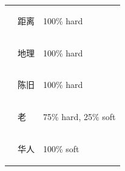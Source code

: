 \documentclass[smallextended,natbib]{svjour3}       %
\providecommand{\DIFaddend}{} %
\begin{document}
\begin{table}[ht]
{\begin{tabular}{|c|l|l|}
       & \begin{CJK}{UTF8}{gbsn}距离\end{CJK}  & 100\% hard                           \\ \cline{2-3} 
       & \begin{CJK}{UTF8}{gbsn}地理\end{CJK}  & 100\% hard                           \\ \cline{2-3} 
       & \begin{CJK}{UTF8}{gbsn}陈旧\end{CJK}  & 100\% hard                           \\ \cline{2-3} 
       & \begin{CJK}{UTF8}{gbsn}老\end{CJK}   & 75\% hard, 25\% soft                 \\ \cline{2-3} 
       & \begin{CJK}{UTF8}{gbsn}华人\end{CJK}  & 100\% soft                           \\ \hline
      \end{tabular}%
      }
  \end{table}
\DIFaddend 
\end{document}

